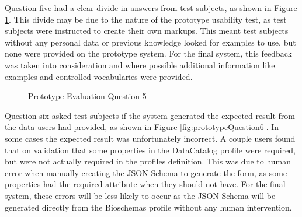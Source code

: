 {
Question five had a clear divide in answers from test subjects, as shown in Figure \ref{fig:prototypeQuestion5}. This divide may be due to the nature of the prototype usability test, as test subjects were instructed to create their own markups. This meant test subjects without any personal data or previous knowledge looked for examples to use, but none were provided on the prototype system. For the final system, this feedback was taken into consideration and where possible additional information like examples and controlled vocabularies were provided.\newline
\begin{figure}[!h]
  \centering
  \begin{minipage}[b]{0.47\textwidth}
    \caption{Prototype Evaluation Question 5}
    \label{fig:prototypeQuestion5}
  \end{minipage}
\end{figure}

Question six asked test subjects if the system generated the expected result from the data users had provided, as shown in Figure \ref{fig:prototypeQuestion6}. In some cases the expected result was unfortunately incorrect. A couple users found that on validation that some properties in the DataCatalog profile were required, but were not actually required in the profiles definition. This was due to human error when manually creating the JSON-Schema to generate the form, as some properties had the required attribute when they should not have. For the final system, these errors will be less likely to occur as the JSON-Schema will be generated directly from the Bioschemas profile without any human intervention. \newline

}
